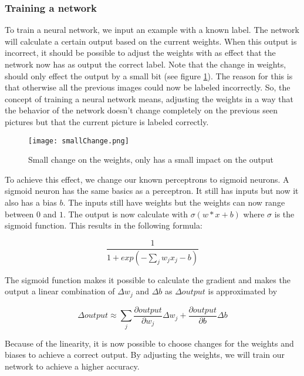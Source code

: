 		\subsubsection{Training a network}
		
To train a neural network, we input an example with a known label. The network will calculate a certain output based on the current weights. When this output is incorrect, it should be possible to adjust the weights with as effect that the network now has as output the correct label. Note that the change in weights, should only effect the output by a small bit (see figure \ref{fig:smallChange}). The reason for this is that otherwise all the previous images could now be labeled incorrectly. So, the concept of training a neural network means, adjusting the weights in a way that the behavior of the network doesn't change completely on the previous seen pictures but that the current picture is labeled correctly.

\begin{figure}[H]
	\centering
	\texttt{[image: smallChange.png]}
	\caption{Small change on the weights, only has a small impact on the output \cite{NNintro:online}}
	\label{fig:smallChange}
\end{figure} 

To achieve this effect, we change our known perceptrons to sigmoid neurons. A sigmoid neuron has the same basics as a perceptron. It still has inputs but now it also has a bias $b$. The inputs still have weights but the weights can now range between $0$ and $1$. The output is now calculate with $\sigma(w*x+b)$ where $\sigma$ is the sigmoid function. This results in the following formula: 

\begin{equation} 
\frac{1}{1+exp(-\sum_j w_jx_j-b)}
\end{equation}

\noindent The sigmoid function makes it possible to calculate the gradient and makes the output a linear combination of $\Delta w_j$ and $\Delta b$ as $\Delta output$ is approximated by 

\begin{equation} 
\Delta output \approx \sum_j \frac{\partial output}{\partial w_j}\Delta w_j + \frac{\partial output}{\partial b}\Delta b
\end{equation}

\noindent Because of the linearity, it is now possible to choose changes for the weights and biases to achieve a correct output. By adjusting the weights, we will train our network to achieve a higher accuracy.
		

